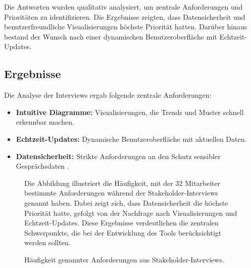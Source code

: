 Die Antworten wurden qualitativ analysiert, um zentrale Anforderungen und Prioritäten zu identifizieren. Die Ergebnisse zeigten, dass Datensicherheit und benutzerfreundliche Visualisierungen höchste Priorität hatten. Darüber hinaus bestand der Wunsch nach einer dynamischen Benutzeroberfläche mit Echtzeit-Updates.

\subsection{Ergebnisse}
Die Analyse der Interviews ergab folgende zentrale Anforderungen:
\begin{itemize}
    \item \textbf{Intuitive Diagramme:} Visualisierungen, die Trends und Muster schnell erkennbar machen.
    \item \textbf{Echtzeit-Updates:} Dynamische Benutzeroberfläche mit aktuellen Daten.
    \item \textbf{Datensicherheit:} Strikte Anforderungen an den Schutz sensibler Gesprächsdaten \cite{bryson2011employee}.
\end{itemize}

\begin{figure}[h!]
    \centering
    Die Abbildung illustriert die Häufigkeit, mit der 32 Mitarbeiter bestimmte Anforderungen während der Stakeholder-Interviews genannt haben. Dabei zeigt sich, dass Datensicherheit die höchste Priorität hatte, gefolgt von der Nachfrage nach Visualisierungen und Echtzeit-Updates. Diese Ergebnisse verdeutlichen die zentralen Schwerpunkte, die bei der Entwicklung des Tools berücksichtigt werden sollten.
    
    \caption{Häufigkeit genannter Anforderungen aus Stakeholder-Interviews.}
    \label{fig:stakeholder_results_barchart}
\end{figure}

